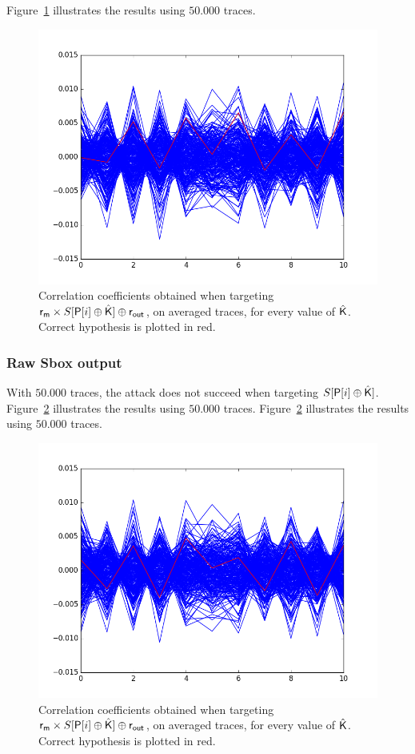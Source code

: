 Figure~\ref{fig:CPA1O_averaged_aZ1} illustrates the results using $50.000$ traces.
\begin{figure}[H]
	\centering 
	\includegraphics[scale=0.4]{figures/CPA1O_averaged_aZ1.png}
	\caption{Correlation coefficients obtained when targeting $\mathsf{r_m} \times S[\mathsf{P}[i]\oplus \hat{\mathsf{K}}] \oplus \mathsf{r_{out}}$, on averaged traces, for every value of $\hat{\mathsf{K}}$. Correct hypothesis is plotted in red.}
	\label{fig:CPA1O_averaged_aZ1}
\end{figure}


\subsubsection{Raw Sbox output}
With $50.000$ traces, the attack does not succeed when targeting $S[\mathsf{P}[i]\oplus \hat{\mathsf{K}}]$.
Figure~\ref{fig:CPA1O_averaged_Z1} illustrates the results using $50.000$ traces.
Figure~\ref{fig:CPA1O_averaged_Z1} illustrates the results using $50.000$ traces.

\begin{figure}[H]
	\centering 
	\includegraphics[scale=0.4]{figures/CPA1O_averaged_Z1.png}
	\caption{Correlation coefficients obtained when targeting $\mathsf{r_m} \times S[\mathsf{P}[i]\oplus \hat{\mathsf{K}}] \oplus \mathsf{r_{out}}$, on averaged traces, for every value of $\hat{\mathsf{K}}$. Correct hypothesis is plotted  in red.}
	\label{fig:CPA1O_averaged_Z1}
\end{figure}

